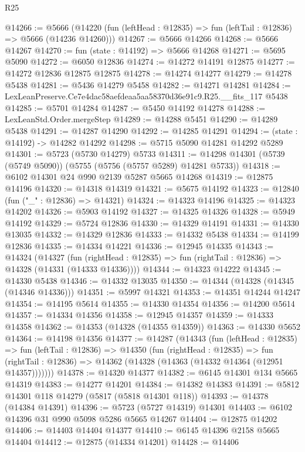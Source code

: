\begin{lexlean}{R25}
\begin{coremodule}
@14266 := @5666
    (@14220 (fun (leftHead : @12835) => fun (leftTail : @12836) => @5666 (@14236 @14260)))
@14267 := @5666 @14266
@14268 := @5666 @14267
@14270 := fun (state : @14192) => @5666 @14268
@14271 := @5695 @5090
@14272 := @6050 @12836
@14274 := @14272 @14191 @12875
@14277 := @14272 @12836 @12875 @12875
@14278 := @14274 @14277
@14279 := @14278 @5438
@14281 := @5436 @14279 @5458
@14282 := @14271 @14281
@14284 := LexLeanPreserve.Ce7e4dac58aefdeaa5aa58370d36e91c9.R25.__fits_117 @5438
@14285 := @5701 @14284
@14287 := @5450 @14192 @14278
@14288 := LexLeanStd.Order.mergeStep
@14289 := @14288 @5451
@14290 := @14289 @5438
@14291 := @14287 @14290
@14292 := @14285 @14291
@14294 := (state : @14192) -> @14282 @14292
@14298 := @5715 @5090 @14281 @14292 @5289
@14301 := @5723 (@5730 @14279) @5733
@14311 := @14298 @14301 (@5739 (@5749 @5090)) (@5755 (@5756 (@5757 @5289) @14281 @5733))
@14318 := @6102 @14301 @24 @990 @2139 @5287 @5665 @14268
@14319 := @12875 @14196
@14320 := @14318 @14319
@14321 := @5675 @14192
@14323 := @12840 (fun ("_" : @12836) => @14321)
@14324 := @14323 @14196
@14325 := @14323 @14202
@14326 := @5903 @14192
@14327 := @14325 @14326
@14328 := @5949 @14192
@14329 := @5724 @12836
@14330 := @14329 @14191
@14331 := @14330 @13035
@14332 := @14329 @12836
@14333 := @14332 @5438
@14334 := @14199 @12836
@14335 := @14334 @14221
@14336 := @12945 @14335
@14343 := @14324
    (@14327
      (fun (rightHead : @12835) => fun (rightTail : @12836) => @14328 (@14331 (@14333 @14336))))
@14344 := @14323 @14222
@14345 := @14330 @5438
@14346 := @14332 @13035
@14350 := @14344 (@14328 (@14345 (@14346 @14336)))
@14351 := @5997 @14321
@14353 := @14351 @14244 @14247
@14354 := @14195 @5614
@14355 := @14330 @14354
@14356 := @14200 @5614
@14357 := @14334 @14356
@14358 := @12945 @14357
@14359 := @14333 @14358
@14362 := @14353 (@14328 (@14355 @14359))
@14363 := @14330 @5652
@14364 := @14198 @14356
@14377 := @14287
    (@14343
      (fun (leftHead : @12835) =>
      fun (leftTail : @12836) =>
      @14350
        (fun (rightHead : @12835) =>
        fun (rightTail : @12836) => @14362 (@14328 (@14363 (@14332 @14364 (@12951 @14357)))))))
@14378 := @14320 @14377
@14382 := @6145 @14301 @134 @5665 @14319
@14383 := @14277 @14201
@14384 := @14382 @14383
@14391 := @5812 @14301 @118 @14279 (@5817 (@5818 @14301 @118))
@14393 := @14378 (@14384 @14391)
@14396 := @5723 (@5727 @14319) @14301
@14403 := @6102 @14396 @31 @990 @5098 @5286 @5665 @14267
@14404 := @12875 @14202
@14406 := @14403 @14404 @14377
@14410 := @6145 @14396 @2158 @5665 @14404
@14412 := @12875 (@14334 @14201)
@14428 := @14406

\end{coremodule}
\end{lexlean}
